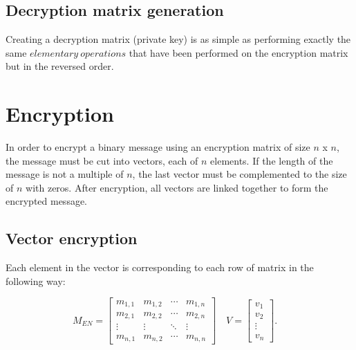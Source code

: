\documentclass{article}
\begin{document}
    \subsection{Decryption matrix generation}
        Creating a decryption matrix (private key) is as simple as performing exactly the same $elementary\ operations$ that have been performed on the encryption matrix but in the reversed order.

\section{Encryption}
    In order to encrypt a binary message using an encryption matrix of size $n$ x $n$, the message must be cut into vectors, each of $n$ elements. If the length of the message is not a multiple of $n$, the last vector must be complemented to the size of $n$ with zeros.
    After encryption, all vectors are linked together to form the encrypted message.
    
\subsection{Vector encryption}
    Each element in the vector is corresponding to each row of matrix in the following way:

    $$
    M_{EN}=\begin{bmatrix}
    m_{1,1} & m_{1,2} & \cdots & m_{1,n} \\
    m_{2,1} & m_{2,2} & \cdots & m_{2,n} \\
    \vdots  & \vdots  & \ddots & \vdots  \\
    m_{n,1} & m_{n,2} & \cdots & m_{n,n} 
    \end{bmatrix}\quad
    V=\begin{bmatrix}
    v_{1}  \\
    v_{2}  \\
    \vdots   \\
    v_{n}  
    \end{bmatrix}.
    \quad$$
    
\end{document}
